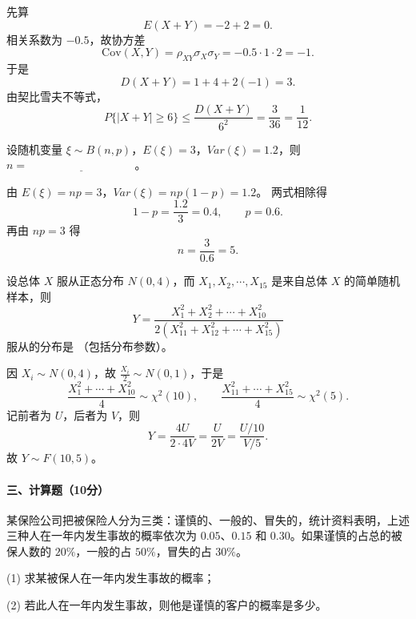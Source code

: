 \documentclass[lang=cn,11pt]{elegantbook}
\begin{document}
\begin{solution}
\par
先算
\[
  E(X+Y)=-2+2=0.
\]
相关系数为 \(-0.5\)，故协方差
\[
  \mathrm{Cov}(X,Y)=\rho_{XY}\sigma_X\sigma_Y=-0.5\cdot1\cdot2=-1.
\]
于是
\[
  D(X+Y)=1+4+2(-1)=3.
\]
由契比雪夫不等式，
\[
  P\{|X+Y|\ge6\}\le \frac{D(X+Y)}{6^2}=\frac{3}{36}=\frac{1}{12}.
\]
\end{solution}
\begin{exercise}
\par
设随机变量 \(\xi\sim B(n,p)\)，\(E(\xi)=3\)，\(Var(\xi)=1.2\)，则 \(n=\underline{\hspace{4cm}}\)。
\end{exercise}

\begin{solution}
\par
由 \(E(\xi)=np=3\)，\(Var(\xi)=np(1-p)=1.2\)。
两式相除得
\[
  1-p=\frac{1.2}{3}=0.4,\qquad p=0.6.
\]
再由 \(np=3\) 得
\[
  n=\frac{3}{0.6}=5.
\]
\end{solution}
\begin{exercise}
\par
设总体 \(X\) 服从正态分布 \(N(0,4)\)，而 \(X_1,X_2,\cdots,X_{15}\) 是来自总体 \(X\) 的简单随机样本，则
\[
Y=\frac{X_1^2+X_2^2+\cdots+X_{10}^2}{2(X_{11}^2+X_{12}^2+\cdots+X_{15}^2)}
\]
服从的分布是 \underline{\hspace{4cm}}（包括分布参数）。
\end{exercise}

\begin{solution}
\par
因 \(X_i\sim N(0,4)\)，故 \(\frac{X_i}{2}\sim N(0,1)\)，于是
\[
  \frac{X_1^2+\cdots+X_{10}^2}{4}\sim \chi^2(10),\qquad
  \frac{X_{11}^2+\cdots+X_{15}^2}{4}\sim \chi^2(5).
\]
记前者为 \(U\)，后者为 \(V\)，则
\[
  Y=\frac{4U}{2\cdot4V}=\frac{U}{2V}
  =\frac{U/10}{V/5}.
\]
故 \(Y\sim F(10,5)\)。
\end{solution}

\paragraph*{三、计算题（10分）}
\begin{exercise}
\par
某保险公司把被保险人分为三类：谨慎的、一般的、冒失的，统计资料表明，上述三种人在一年内发生事故的概率依次为 \(0.05\)、\(0.15\) 和 \(0.30\)。如果谨慎的占总的被保人数的 \(20\%\)，一般的占 \(50\%\)，冒失的占 \(30\%\)。

(1) 求某被保人在一年内发生事故的概率；

(2) 若此人在一年内发生事故，则他是谨慎的客户的概率是多少。
\end{exercise}
\end{document}
